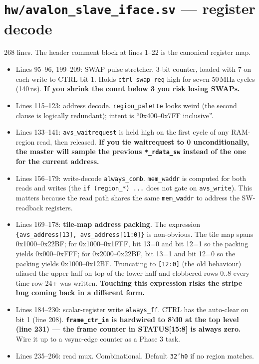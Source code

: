 \documentclass[11pt,letterpaper]{article}
\begin{document}
\section{\texttt{hw/avalon\_slave\_iface.sv} --- register decode}

268 lines. The header comment block at lines 1--22 is the canonical
register map.

\begin{itemize}[leftmargin=*]
  \item Lines 95--96, 199--209: SWAP pulse stretcher. 3-bit counter, loaded
    with 7 on each write to CTRL bit 1. Holds \texttt{ctrl\_swap\_req} high
    for seven 50\,MHz cycles (140\,ns). \textbf{If you shrink the count
    below 3 you risk losing SWAPs.}
  \item Lines 115--123: address decode. \texttt{region\_palette} looks weird
    (the second clause is logically redundant); intent is ``0x400--0x7FF
    inclusive''.
  \item Lines 133--141: \texttt{avs\_waitrequest} is held high on the first
    cycle of any RAM-region read, then released. \textbf{If you tie
    waitrequest to 0 unconditionally, the master will sample the previous
    \texttt{*\_rdata\_sw} instead of the one for the current address.}
  \item Lines 156--179: write-decode \texttt{always\_comb}.
    \texttt{mem\_waddr} is computed for both reads and writes (the
    \texttt{if (region\_*) ...} does not gate on \texttt{avs\_write}). This
    matters because the read path shares the same \texttt{mem\_waddr} to
    address the SW-readback registers.
  \item Lines 169--178: \textbf{tile-map address packing}. The expression
    \texttt{\{avs\_address[13], avs\_address[11:0]\}} is non-obvious. The
    tile map spans 0x1000--0x22BF; for 0x1000--0x1FFF, bit 13=0 and bit
    12=1 so the packing yields 0x000--0xFFF; for 0x2000--0x22BF, bit 13=1
    and bit 12=0 so the packing yields 0x1000--0x12BF. Truncating to
    \texttt{[12:0]} (the old behaviour) aliased the upper half on top of
    the lower half and clobbered rows 0..8 every time row 24+ was written.
    \textbf{Touching this expression risks the stripe bug coming back in a
    different form.}
  \item Lines 184--230: scalar-register write \texttt{always\_ff}. CTRL has
    the auto-clear on bit 1 (line 208). \textbf{\texttt{frame\_ctr\_in} is
    hardwired to 8'd0 at the top level (line 231) --- the frame counter in
    STATUS[15:8] is always zero.} Wire it up to a vsync-edge counter as a
    Phase 3 task.
  \item Lines 235--266: read mux. Combinational. Default \texttt{32'h0} if
    no region matches.
\end{itemize}
\end{document}
